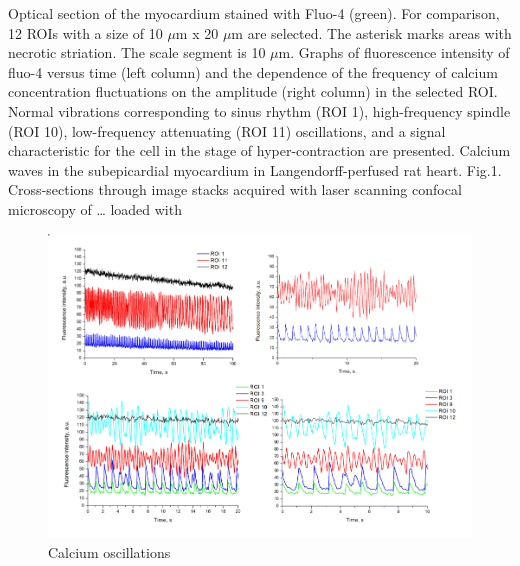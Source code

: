 \documentclass[a4paper,12pt]{article}
\begin{document}
Optical section of the myocardium stained with Fluo-4 (green). For comparison, 12 ROIs with a size of 10 $\mu$m x 20 $\mu$m are selected. The asterisk marks areas with necrotic striation. The scale segment is 10 $\mu$m.
Graphs of fluorescence intensity of fluo-4 versus time (left column) and the dependence of the frequency of calcium concentration fluctuations on the amplitude (right column) in the selected ROI. Normal vibrations corresponding to sinus rhythm (ROI 1), high-frequency spindle (ROI 10), low-frequency attenuating (ROI 11) oscillations, and a signal characteristic for the cell in the stage of hyper-contraction are presented.
Calcium waves in the subepicardial myocardium in Langendorff-perfused rat heart. Fig.1. Cross-sections through image stacks acquired with laser scanning confocal microscopy of … loaded with

\begin{figure}
    \includegraphics{fig9.png}
    \caption{Calcium oscillations}
    \label{fig:fig9}
\end{figure}
\end{document}
